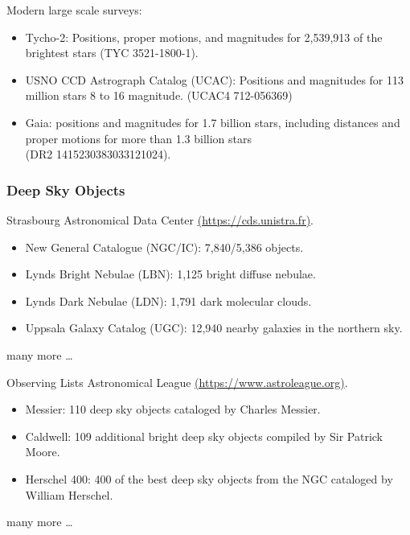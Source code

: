 
\begin{frame}{\insertsubsubsectionhead}
  \Large
  Modern large scale surveys:
  \begin{itemize}
    \item Tycho-2: Positions, proper motions, and magnitudes for 2,539,913
    of the brightest stars (TYC 3521-1800-1).
    \item USNO CCD Astrograph Catalog (UCAC): Positions and magnitudes for 113 million
    stars 8 to 16 magnitude. (UCAC4 712-056369)
    \item Gaia: positions and magnitudes for 1.7 billion stars, including distances
    and proper motions for more than 1.3 billion stars \\(DR2 1415230383033121024).
  \end{itemize}
\end{frame}

\subsubsection{Deep Sky Objects}

\begin{frame}{\insertsubsubsectionhead}
  \Large
  Strasbourg Astronomical Data Center \href{https://cds.unistra.fr/}{(https://cds.unistra.fr)}.
  \begin{itemize}
    \item New General Catalogue (NGC/IC): 7,840/5,386 objects.
    \item Lynds Bright Nebulae (LBN): 1,125 bright diffuse nebulae.
    \item Lynds Dark Nebulae (LDN): 1,791 dark molecular clouds.
    \item Uppsala Galaxy Catalog (UGC): 12,940 nearby galaxies in the northern sky.
  \end{itemize}
  \hspace{1em} many more \dots
\end{frame}


\begin{frame}{Observing Lists}
  \Large
  Astronomical League \href{https://www.astroleague.org/al/obsclubs/AlphabeticObservingClubs.html}{(https://www.astroleague.org)}.

  \begin{itemize}
    \item Messier: 110 deep sky objects cataloged by Charles Messier.
    \item Caldwell: 109 additional bright deep sky objects compiled by Sir Patrick Moore.
    \item Herschel 400: 400 of the best deep sky objects from the NGC cataloged by William Herschel.
  \end{itemize}
  \hspace{1em} many more \dots
\end{frame}

